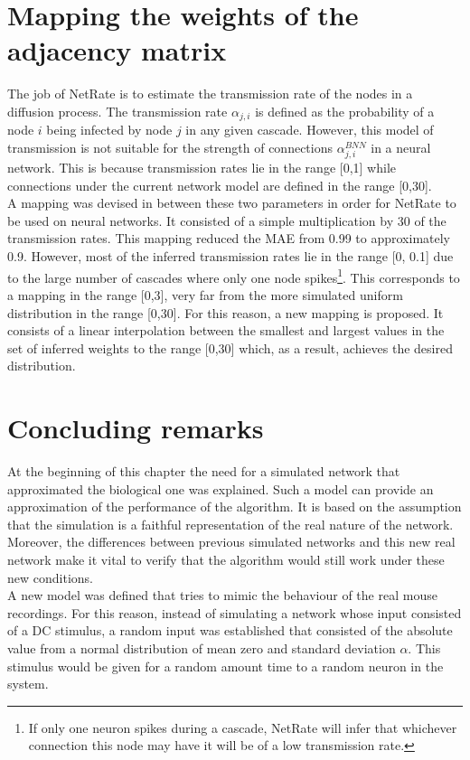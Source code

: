 \section{Mapping the weights of the adjacency matrix}

The job of NetRate is to estimate the transmission rate of the nodes in a diffusion process. The transmission rate \(\alpha_{j,i}\) is defined as the probability of a node \(i\) being infected by node \(j\) in any given cascade. However, this model of transmission is not suitable for the strength of connections \(\alpha_{j,i}^{BNN}\) in a neural network. This is because transmission rates lie in the range [0,1] while connections under the current network model are defined in the range [0,30]. \\

A mapping was devised in \cite{pranav_report} between these two parameters in order for NetRate to be used on neural networks. It consisted of a simple multiplication by 30 of the transmission rates. This mapping reduced the MAE from 0.99 to approximately 0.9. However, most of the inferred transmission rates lie in the range [0, 0.1] due to the large number of cascades where only one node spikes\footnote{If only one neuron spikes during a cascade, NetRate will infer that whichever connection this node may have it will be of a low transmission rate.}. This corresponds to a mapping in the range [0,3], very far from the more simulated uniform distribution in the range [0,30]. For this reason, a new mapping is proposed. It consists of a linear interpolation between the smallest and largest values in the set of inferred weights to the range [0,30] which, as a result, achieves the desired distribution.


\section{Concluding remarks}

At the beginning of this chapter the need for a simulated network that approximated the biological one was explained. Such a model can provide an approximation of the performance of the algorithm. It is based on the assumption that the simulation is a faithful representation of the real nature of the network. Moreover, the differences between previous simulated networks and this new real network make it vital to verify that the algorithm would still work under these new conditions. \\

A new model was defined that tries to mimic the behaviour of the real mouse recordings. For this reason, instead of simulating a network whose input consisted of a DC stimulus, a random input was established that consisted of the absolute value from a normal distribution of mean zero and standard deviation \(\alpha\). This stimulus would be given for a random amount time to a random neuron in the system. \\

